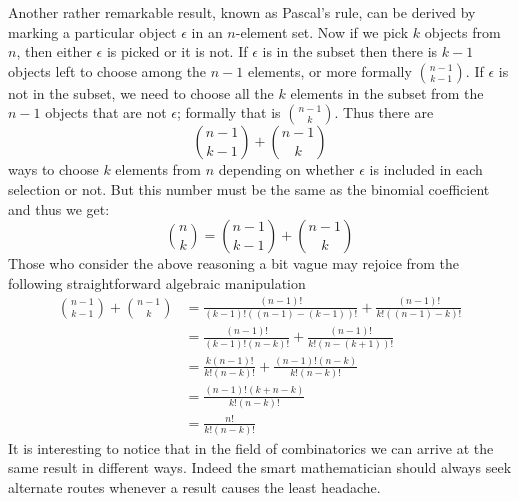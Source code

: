 \myindent Another rather remarkable result, known as Pascal's rule, can be derived by marking a particular object
$\epsilon$ in an $n$-element set. Now if we pick $k$ objects from $n$, then either $\epsilon$ is picked or it is not. If
$\epsilon$ is in the subset then there is $k-1$ objects left to choose among the $n-1$ elements, or more formally
$\binom{n-1}{k-1}$. If $\epsilon$ is not in the subset, we need to choose all the $k$ elements in the subset from the
$n-1$ objects that are not $\epsilon$; formally that is $\binom{n-1}{k}$. Thus there are 
\[
\binom{n-1}{k-1} + \binom{n-1}{k}
\]
ways to choose $k$ elements from $n$ depending on whether $\epsilon$ is included in each selection or not. But this
number must be the same as the binomial coefficient and thus we get: 
\begin{equation}\label{pascal_rule}
\binom{n}{k}  = \binom{n-1}{k-1} + \binom{n-1}{k}
\end{equation}
Those who consider the above reasoning a bit vague may rejoice from the following straightforward algebraic manipulation
\begin{align*}
 \binom{n-1}{k-1} + \binom{n-1}{k} 
& =  \frac{(n-1)!}{(k-1)!((n-1)-(k-1))!} + \frac{(n-1)!}{k!((n - 1) - k)!} \\
& =  \frac{(n-1)!}{(k-1)!(n-k)!} + \frac{(n-1)!}{k!(n - (k + 1))!} \\
& =  \frac{k(n-1)!}{k!(n-k)!} + \frac{(n-1)!(n-k)}{k!(n - k)!} \\
& =  \frac{(n-1)!(k + n - k)}{k!(n-k)!} \\
& =  \frac{n!}{k!(n-k)!} 
\end{align*}
It is interesting to notice that in the field of combinatorics we can arrive at the same result in different ways.
Indeed the smart mathematician should always seek alternate routes whenever a result causes the least headache.




